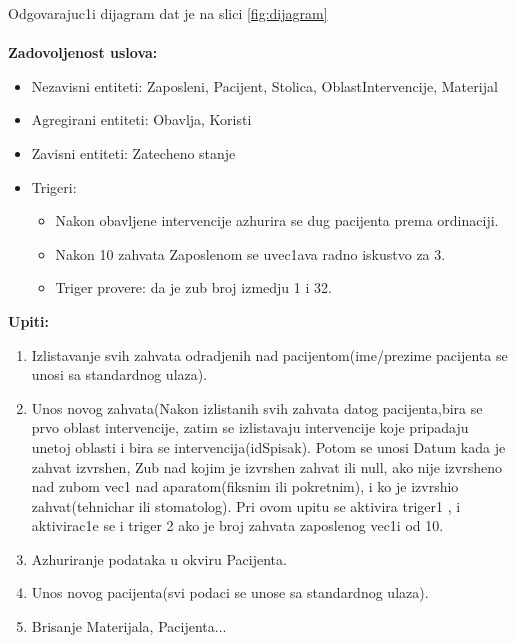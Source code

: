 \documentclass[10 pt]{article}
\begin{document}
Odgovarajuc1i dijagram dat je na slici \ref{fig:dijagram}
\\
\\
\textbf{Zadovoljenost uslova:}
\begin{itemize}
	\item Nezavisni entiteti: Zaposleni, Pacijent, Stolica, OblastIntervencije, Materijal
	\item Agregirani entiteti: Obavlja, Koristi
	\item Zavisni entiteti: Zatecheno stanje
	\item Trigeri: 
		\begin{itemize}
			\item Nakon obavljene intervencije azhurira se dug pacijenta prema ordinaciji.
			\item Nakon 10 zahvata Zaposlenom se uvec1ava radno iskustvo za 3.
			\item Triger provere: da je zub broj izmedju 1 i 32. 
		\end{itemize}	
\end{itemize}


\textbf{Upiti:}
\begin{enumerate}
	\item Izlistavanje svih zahvata odradjenih nad pacijentom(ime/prezime pacijenta se unosi sa standardnog ulaza).
	\item Unos novog zahvata(Nakon izlistanih svih zahvata datog pacijenta,bira se prvo oblast intervencije, zatim se izlistavaju intervencije koje pripadaju unetoj oblasti i bira se intervencija(idSpisak). Potom se unosi Datum kada je zahvat izvrshen, Zub nad kojim je izvrshen zahvat ili null, ako nije izvrsheno nad zubom vec1 nad aparatom(fiksnim ili pokretnim), i ko je izvrshio zahvat(tehnichar ili stomatolog). Pri ovom upitu se aktivira triger1 , i aktivirac1e se i triger 2 ako je broj zahvata zaposlenog vec1i od 10. 
	\item Azhuriranje podataka u okviru Pacijenta. 
	\item Unos novog pacijenta(svi podaci se unose sa standardnog ulaza).
	\item Brisanje Materijala, Pacijenta...
\end{enumerate}
\end{document}

